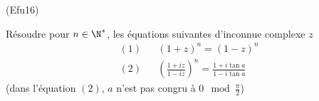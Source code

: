 \begin{tiny}(Efu16)\end{tiny} Résoudre pour $n\in \N^*$, les équations suivantes d'inconnue complexe $z$
\begin{align*}
 &(1)& &(1+z)^n = (1-z)^n \\
 &(2)& &\left( \frac{1+iz}{1-iz}\right)^n = \frac{1+i\tan a}{1-i\tan a} 
\end{align*}
(dans l'équation $(2)$, $a$ n'est pas congru à $0 \mod \frac{\pi}{2}$) 